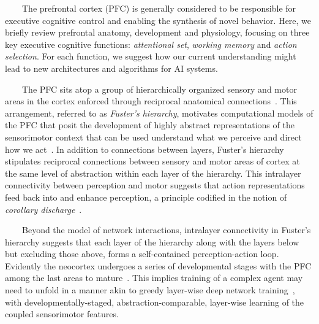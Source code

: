 
\begin{center}
  \begin{tcolorbox}[breakable,sharp corners=all,coltitle=black,colbacktitle=white,
    width=\textwidth,boxsep=5pt,left=5pt,right=5pt,
    title={\textbf{Box C: Hierarchy, Abstraction and Executive Control}}]
   
    
~~~~The prefrontal cortex (PFC) is generally considered to be responsible for executive cognitive control and enabling the synthesis of novel behavior. Here, we briefly review prefrontal anatomy, development and physiology, focusing on three key executive cognitive functions: {\it{attentional set}}, {\it{working memory}} and {\it{action selection}}. For each function, we suggest how our current understanding might lead to new architectures and algorithms for AI systems.

~~~~The PFC sits atop a group of hierarchically organized sensory and motor areas in the cortex enforced through reciprocal anatomical connections~\cite{FusterPREFRONTAL-CORTEX-15}. This arrangement, referred to as {\it{Fuster’s hierarchy}}, motivates computational models of the PFC that posit the development of highly abstract representations of the sensorimotor context that can be used understand what we perceive and direct how we act~\cite{BotvinickPTRS_B-07}. In addition to connections between layers, Fuster’s hierarchy stipulates reciprocal connections between sensory and motor areas of cortex at the same level of abstraction within each layer of the hierarchy. This intralayer connectivity between perception and motor suggests that action representations feed back into and enhance perception, a principle codified in the notion of {\it{corollary discharge}}~\cite{mccloskey2011corollary}.

~~~~Beyond the model of network interactions, intralayer connectivity in Fuster's hierarchy suggests that each layer of the hierarchy along with the layers below but excluding those above, forms a self-contained perception-action loop. Evidently the neocortex undergoes a series of developmental stages with the PFC among the last areas to mature~\cite{guillery2005postnatal}. This implies training of a complex agent may need to unfold in a manner akin to greedy layer-wise deep network training~\cite{BengioetalNIPS-07,belilovsky2018greedy}, with developmentally-staged, abstraction-comparable, layer-wise learning of the coupled sensorimotor features.


\end{tcolorbox}
\end{center}
